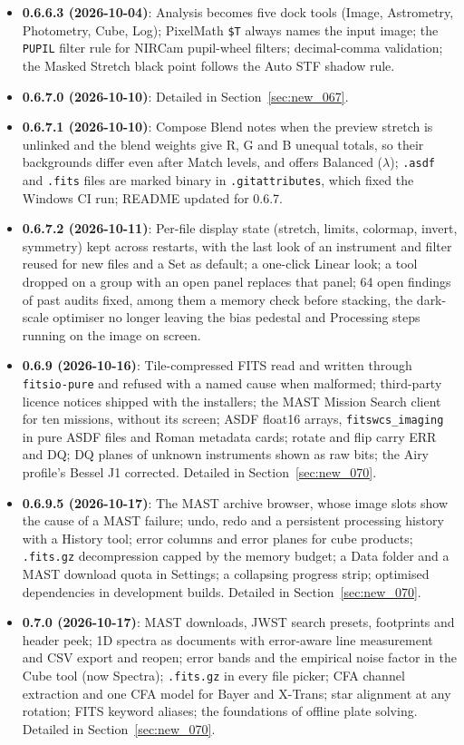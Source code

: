 \documentclass[11pt,a4paper]{article}
\newcommand{\code}[1]{\texttt{\small #1}}
\newcommand{\crate}[1]{\texttt{#1}}
\begin{document}
\begin{itemize}[nosep]
    \item \textbf{0.6.6.3 (2026-10-04)}: Analysis becomes five dock tools (Image, Astrometry, Photometry, Cube, Log); PixelMath \code{\$T} always names the input image; the \code{PUPIL} filter rule for NIRCam pupil-wheel filters; decimal-comma validation; the Masked Stretch black point follows the Auto STF shadow rule.
    \item \textbf{0.6.7.0 (2026-10-10)}: Detailed in Section~\ref{sec:new_067}.
    \item \textbf{0.6.7.1 (2026-10-10)}: Compose Blend notes when the preview stretch is unlinked and the blend weights give R, G and B unequal totals, so their backgrounds differ even after Match levels, and offers Balanced ($\lambda$); \code{.asdf} and \code{.fits} files are marked binary in \code{.gitattributes}, which fixed the Windows CI run; README updated for 0.6.7.
    \item \textbf{0.6.7.2 (2026-10-11)}: Per-file display state (stretch, limits, colormap, invert, symmetry) kept across restarts, with the last look of an instrument and filter reused for new files and a Set as default; a one-click Linear look; a tool dropped on a group with an open panel replaces that panel; 64 open findings of past audits fixed, among them a memory check before stacking, the dark-scale optimiser no longer leaving the bias pedestal and Processing steps running on the image on screen.
    \item \textbf{0.6.9 (2026-10-16)}: Tile-compressed FITS read and written through \crate{fitsio-pure} and refused with a named cause when malformed; third-party licence notices shipped with the installers; the MAST Mission Search client for ten missions, without its screen; ASDF float16 arrays, \code{fitswcs\_imaging} in pure ASDF files and Roman metadata cards; rotate and flip carry ERR and DQ; DQ planes of unknown instruments shown as raw bits; the Airy profile's Bessel J1 corrected. Detailed in Section~\ref{sec:new_070}.
    \item \textbf{0.6.9.5 (2026-10-17)}: The MAST archive browser, whose image slots show the cause of a MAST failure; undo, redo and a persistent processing history with a History tool; error columns and error planes for cube products; \code{.fits.gz} decompression capped by the memory budget; a Data folder and a MAST download quota in Settings; a collapsing progress strip; optimised dependencies in development builds. Detailed in Section~\ref{sec:new_070}.
    \item \textbf{0.7.0 (2026-10-17)}: MAST downloads, JWST search presets, footprints and header peek; 1D spectra as documents with error-aware line measurement and CSV export and reopen; error bands and the empirical noise factor in the Cube tool (now Spectra); \code{.fits.gz} in every file picker; CFA channel extraction and one CFA model for Bayer and X-Trans; star alignment at any rotation; FITS keyword aliases; the foundations of offline plate solving. Detailed in Section~\ref{sec:new_070}.

\end{itemize}
\end{document}
